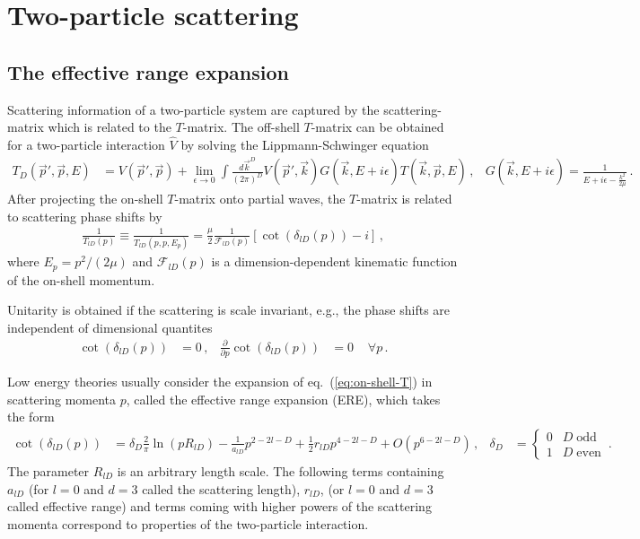 \section{Two-particle scattering}

\subsection{The effective range expansion}
Scattering information of a two-particle system are captured by the scattering-matrix which is related to the $T$-matrix.
The off-shell $T$-matrix can be obtained for a two-particle interaction $\hat V$ by solving the Lippmann-Schwinger equation
\begin{align}
	T_D(\vec p', \vec p, E)
	&=
	V(\vec p', \vec p) + \lim\limits_{\epsilon \to 0}\int \frac{d \vec k^D}{(2\pi)^D} V(\vec p', \vec k) G(\vec k, E + i \epsilon) T(\vec k, \vec p, E) \, ,
	&
	G(\vec k, E+ i \epsilon) = \frac{1}{E + i \epsilon - \frac{k^2}{2\mu}}
	\, .
\end{align}
After projecting the on-shell $T$-matrix onto partial waves,
the $T$-matrix is related to scattering phase shifts by
\begin{align}\label{eq:on-shell-T}
	\frac{1}{T_{lD}(p)}
    \equiv
    \frac{1}{T_{lD}(p, p, E_p)}
    = \frac{\mu}{2}
    \frac{1}{\mathcal F_{l D}(p)} \left[\cot (\delta_{l D}(p)) - i\right] \, ,
\end{align}
where $E_p = p^2 / (2 \mu)$ and $\mathcal F_{l D}(p)$ is a dimension-dependent kinematic function of the on-shell momentum.

Unitarity is obtained if the scattering is scale invariant, e.g., the phase shifts are independent of dimensional quantites
\begin{align}
    \cot (\delta_{l D}(p)) &= 0
    \,, &
    \frac{\partial}{\partial p}\cot (\delta_{l D}(p)) &= 0
    \, &
    \, \forall p\,.
\end{align}

Low energy theories usually consider the expansion of eq.~(\ref{eq:on-shell-T}) in scattering momenta $p$, called the effective range expansion (ERE), which takes the form \cite{Hammer:2010fw}
\begin{align}
    \cot \left(\delta_{l D}(p)\right)
    &=
    \delta_D \frac{2}{\pi}  \ln \left(p R_{l D}\right)
    -
    \frac{1}{a_{l D}} p^{2 - 2 l - D} +\frac{1}{2} r_{l D} p^{4 - 2 l - D} + O\left(p^{6 - 2 l - D}\right)
    \, , &
    \delta_D &= \begin{cases}
        0 & D \;\text{odd} \\ 1 & D \;\text{even}
    \end{cases}
    \, .
\end{align}
The parameter $R_{l D}$ is an arbitrary length scale.
The following terms containing $a_{l D}$ (for $l=0$ and $d=3$ called the scattering length), $r_{l D}$, (or $l=0$ and $d=3$ called effective range) and terms coming with higher powers of the scattering momenta correspond to properties of the two-particle interaction.

